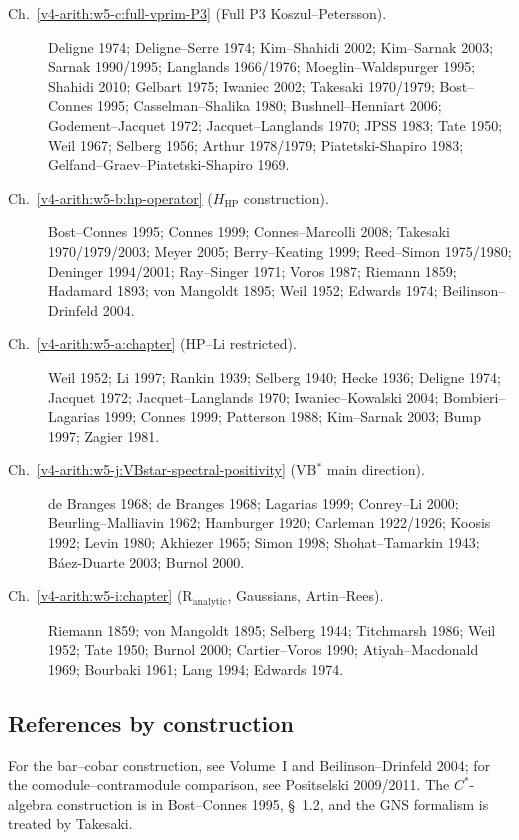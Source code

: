 \begin{description}
\item[Ch.~\ref{v4-arith:w5-c:full-vprim-P3} (Full P3 Koszul--Petersson).] Deligne 1974;
Deligne--Serre 1974; Kim--Shahidi 2002; Kim--Sarnak 2003;
Sarnak 1990/1995; Langlands 1966/1976; Moeglin--Waldspurger 1995;
Shahidi 2010; Gelbart 1975; Iwaniec 2002; Takesaki 1970/1979;
Bost--Connes 1995; Casselman--Shalika 1980; Bushnell--Henniart 2006;
Godement--Jacquet 1972; Jacquet--Langlands 1970; JPSS 1983;
Tate 1950; Weil 1967; Selberg 1956; Arthur 1978/1979;
Piatetski-Shapiro 1983; Gelfand--Graev--Piatetski-Shapiro 1969.

\item[Ch.~\ref{v4-arith:w5-b:hp-operator} (\(H_{\mathrm{HP}}\) construction).] Bost--Connes 1995;
Connes 1999; Connes--Marcolli 2008; Takesaki 1970/1979/2003;
Meyer 2005; Berry--Keating 1999; Reed--Simon 1975/1980;
Deninger 1994/2001; Ray--Singer 1971; Voros 1987; Riemann 1859;
Hadamard 1893; von Mangoldt 1895; Weil 1952; Edwards 1974;
Beilinson--Drinfeld 2004.

\item[Ch.~\ref{v4-arith:w5-a:chapter} (HP--Li restricted).] Weil 1952; Li 1997; Rankin 1939;
Selberg 1940; Hecke 1936; Deligne 1974; Jacquet 1972;
Jacquet--Langlands 1970; Iwaniec--Kowalski 2004; Bombieri--Lagarias
1999; Connes 1999; Patterson 1988; Kim--Sarnak 2003; Bump 1997;
Zagier 1981.

\item[Ch.~\ref{v4-arith:w5-j:VBstar-spectral-positivity} (VB\(^{*}\) main direction).] de Branges 1968;
de Branges 1968; Lagarias 1999; Conrey--Li 2000;
Beurling--Malliavin 1962; Hamburger 1920; Carleman 1922/1926;
Koosis 1992; Levin 1980; Akhiezer 1965; Simon 1998;
Shohat--Tamarkin 1943; B\'aez-Duarte 2003; Burnol 2000.

\item[Ch.~\ref{v4-arith:w5-i:chapter} (\(\mathrm{R}_{\mathrm{analytic}}\), Gaussians,
Artin--Rees).] Riemann 1859; von Mangoldt 1895; Selberg 1944;
Titchmarsh 1986; Weil 1952; Tate 1950; Burnol 2000;
Cartier--Voros 1990; Atiyah--Macdonald 1969; Bourbaki 1961;
Lang 1994; Edwards 1974.
\end{description}

\subsection{References by construction}
\label{v4-arith:w5-synth:disjoint-statement}

For the bar--cobar construction, see Volume~I and
Beilinson--Drinfeld 2004; for the comodule--contramodule comparison,
see Positselski 2009/2011. The \(C^*\)-algebra construction is in
Bost--Connes 1995, \S~1.2, and the GNS formalism is treated by
Takesaki.

